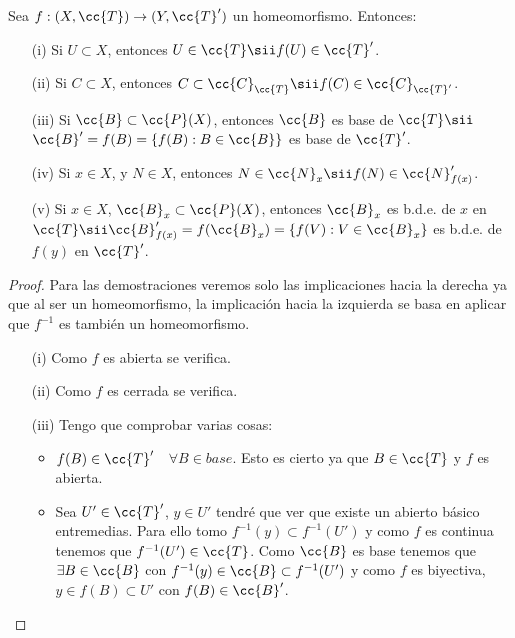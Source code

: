 \begin{prop}
    Sea $f:(X, \cc{T})\to (Y, \cc{T}')$ un homeomorfismo. Entonces:
    \begin{enumerate}
        \item[(i)] Si $U\subset X$, entonces $U\in \cc{T}\sii f(U)\in \cc{T}'$.
        \item[(ii)] Si $C\subset X$, entonces $C\subset \cc{C}_{\cc{T}} \sii f(C)\in \cc{C}_{\cc{T}'}$.
        \item[(iii)] Si $\cc{B}\subset\cc{P}(X)$, entonces $\cc{B}$ es base de $\cc{T} \sii $ $\cc{B}'=f(B)=\{f(B):B\in \cc{B}\}$ es base de $\cc{T}'$.
        \item[(iv)] Si $x\in X$, y $N\in X$, entonces $N\in \cc{N}_x \sii f(N)\in \cc{N}_{f(x)}'$.
        \item[(v)] Si $x\in X$, $\cc{B}_x\subset \cc{P}(X)$, entonces $\cc{B}_x$ es b.d.e. de $x$ en $\cc{T} \sii \cc{B}_{f(x)}'=f(\cc{B}_x)=\{f(V):V\in \cc{B}_x\}$ es b.d.e. de $f(y)$ en $\cc{T}'$.     
    \end{enumerate}

    \begin{proof}
        Para las demostraciones veremos solo las implicaciones hacia la derecha ya que al ser un homeomorfismo, la implicación hacia la izquierda se basa en aplicar que $f^{-1}$ es también un homeomorfismo.

        \begin{enumerate}
            \item[(i)] Como $f$ es abierta se verifica.
            \item[(ii)] Como $f$ es cerrada se verifica.
            \item[(iii)] Tengo que comprobar varias cosas:
            \begin{itemize}
                \item $f(B)\in \cc{T}'$\ \ $\forall B \in base$. Esto es cierto ya que $B\in \cc{T}$ y $f$ es abierta.
                \item Sea $U'\in \cc{T}'$, $y\in U'$ tendré que ver que existe un abierto básico entremedias. Para ello tomo $f^{-1}(y)\subset f^{-1}(U')$ y como $f$ es continua tenemos que $f^{-1}(U')\in \cc{T}$. Como $\cc{B}$ es base tenemos que $\exists B \in \cc{B}$ con $f^{-1}(y)\in \cc{B}\subset f^{-1}(U')$ y como $f$ es biyectiva, $y\in f(B)\subset U'$ con $f(B)\in \cc{B}'$.
            \end{itemize}
            \begin{center}
\end{center}
\end{enumerate}
\end{proof}
\end{prop}
